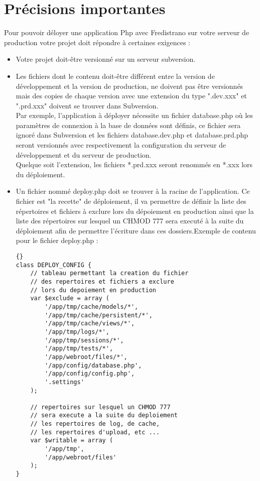 \documentclass[12pt,a4paper]{report}
\begin{document}
\section{Précisions importantes}\label{precimportantes}
Pour pouvoir déloyer une application Php avec Fredistrano sur votre serveur de production votre projet doit répondre à certaines exigences :\\
\begin{itemize}
\item Votre projet doit-être versionné sur un serveur subversion.\\
\item Les fichiers dont le contenu doit-\^{e}tre différent entre la version de développement et la version de production, ne doivent pas être versionnés mais des copies de chaque version avec une extension du type ".dev.xxx" et ".prd.xxx" doivent se trouver dans Subversion.\\
Par exemple, l'application à déployer nécessite un fichier database.php où les paramètres de connexion à la base de données sont définis, ce fichier sera ignoré dans Subversion et les fichiers database.dev.php et database.prd.php seront versionnés avec respectivement la configuration du serveur de développement et du serveur de production.\\
Quelque soit l'extension, les fichiers *.prd.xxx seront renommés en *.xxx lors du déploiement.\\
\item Un fichier nommé deploy.php doit se trouver à la racine de l'application. Ce fichier est "la recette" de déploiement, il va permettre de définir la liste des répertoires et fichiers à exclure lors du dépoiement en production ainsi que la liste des répertoires sur lesquel un CHMOD 777 sera executé à la suite du déploiement afin de permettre l'écriture dans ces dossiers.\newpage Exemple de contenu pour le fichier deploy.php :\\

\lstset{language=Php}
\lstset{commentstyle=\textit}
\begin{lstlisting}[frame=tb]{}
class DEPLOY_CONFIG {
	// tableau permettant la creation du fichier
	// des repertoires et fichiers a exclure 
	// lors du depoiement en production
	var $exclude = array (
		'/app/tmp/cache/models/*',
		'/app/tmp/cache/persistent/*',
		'/app/tmp/cache/views/*',
		'/app/tmp/logs/*',
		'/app/tmp/sessions/*',
		'/app/tmp/tests/*',
		'/app/webroot/files/*',
		'/app/config/database.php',
		'/app/config/config.php',
		'.settings'
	);

	// repertoires sur lesquel un CHMOD 777 
	// sera execute a la suite du deploiement
	// les repertoires de log, de cache, 
	// les repertoires d'upload, etc ...
	var $writable = array (
		'/app/tmp',
		'/app/webroot/files'
	);
}
\end{lstlisting}

\end{itemize}
\newpage
\end{document}
